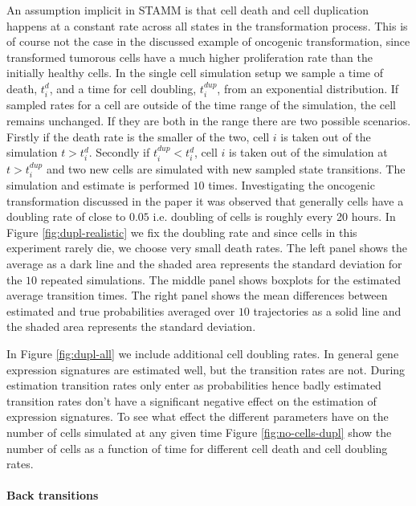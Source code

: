 An assumption implicit in STAMM is that cell death and cell duplication happens at a constant rate across all states in the transformation process. This is of course not the case in the discussed example of oncogenic transformation, since transformed tumorous cells have a much higher proliferation rate than the initially healthy cells. In the single cell simulation setup we sample a time of death, $t_i^{d}$, and a time for cell doubling, $t_i^{dup}$, from an exponential distribution. If sampled rates for a cell are outside of the time range of the simulation, the cell remains unchanged. If they are both in the range there are two possible scenarios. Firstly if the death rate is the smaller of the two, cell $i$ is taken out of the simulation $t>t_i^d$. Secondly if $t_i^{dup}<t_i^d$, cell $i$ is taken out of the simulation at $t > t_i^{dup}$ and two new cells are simulated with new sampled state transitions. The simulation and estimate is performed $10$ times. Investigating the oncogenic transformation discussed in the paper it was observed that generally cells have a doubling rate of close to $0.05$ i.e. doubling of cells is roughly every 20 hours. In Figure \ref{fig:dupl-realistic} we fix the doubling rate and since cells in this experiment rarely die, we choose very small death rates. The left panel shows the average as a dark line and the shaded area represents the standard deviation for the $10$ repeated simulations. The middle panel shows boxplots for the estimated average transition times. The right panel shows the mean differences between estimated and true probabilities averaged over $10$ trajectories as a solid line and the shaded area represents the standard deviation.

In Figure \ref{fig:dupl-all} we include additional cell doubling rates. In general gene expression signatures are estimated well, but the transition rates are not. During estimation transition rates only enter as probabilities hence badly estimated transition rates don't have a significant negative effect on the estimation of expression signatures. To see what effect the different parameters have on the number of cells simulated at any given time Figure \ref{fig:no-cells-dupl} show the number of cells as a function of time for different cell death and cell doubling rates.



\paragraph{Back transitions}
\label{sec:back-transitions}

